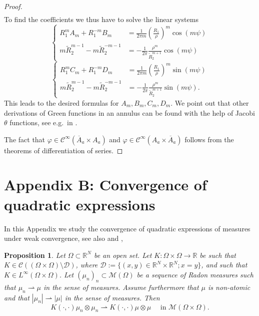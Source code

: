 \documentclass[12pt,reqno]{amsart}
\newtheorem{proposition}[theorem]{Proposition}
\def\C{{\mathcal C}}
\def\D{{\mathcal D}}
\def\M{{\mathcal M}}
\newcommand{\R}{\mathbb{R}}
\numberwithin{equation}{section}
\begin{document}
\begin{proof}
\begin{align*}
\end{align*}
To find the coefficients we thus have to solve the linear systems
\begin{equation*}
\left\{
\begin{array}{rcll}
R_1^mA_m+R_1^{-m}B_m &=\frac{1}{2\pi m} \left(\frac{R_1}{\rho} \right)^m \cos (m\psi) \\
m\tilde{R}_2^{m-1}-m\tilde{R}_2^{-m-1} &= -\frac{1}{2\pi} \frac{\rho^m}{\tilde{R}_2^{m+1}}\cos (m\psi) 
\end{array}
\right.
\end{equation*}
\begin{equation*}
\left\{
\begin{array}{rcll}
R_1^mC_m+R_1^{-m}D_m &=\frac{1}{2\pi m} \left(\frac{R_1}{\rho} \right)^m \sin(m\psi) \\
m\tilde{R}_2^{m-1}-m\tilde{R}_2^{-m-1} &= -\frac{1}{2\pi} \frac{\rho^m}{\tilde{R}_2^{m+1}}\sin (m\psi).
\end{array}
\right.
\end{equation*}
This leads to the desired formulas for \(A_m,B_m,C_m,D_m\). We point out that other derivations of Green functions in an annulus can be found with the help of Jacobi \(\theta\) functions, see e.g.\ in \cite{fetter67,Guenther_Massignan_Fetter_2017}.

The fact that \(\varphi \in \C^\infty(\overline{A}_a\times A_a)\) and \(\varphi \in \C^\infty( A_a\times \overline{A}_a)\) follows from the theorems of differentiation of series.
\end{proof}
\section*{Appendix B: Convergence of quadratic expressions}

In this Appendix we study the convergence of quadratic expressions of measures under weak convergence, see also \cite[Lemma 5.3]{Schochet_1995} and \cite[Lemma 6.3]{Peszek_Rodiac_2025},
\begin{proposition}\label{prop:Appendixb}
Let \(\Omega \subset \R^N\) be an open set. Let \(K:\Omega \times \Omega \rightarrow \R\) be such that \(K\in \C((\Omega \times \Omega) \setminus \D)\), where \(\D:=\{(x,y)\in \R^N\times \R^N; x=y\}\), and such that \(K\in L^\infty (\Omega \times \Omega)\). Let \( (\mu_n)_n\subset \mathcal{M}(\Omega)\) be a sequence of Radon measures such that \(\mu_n \rightharpoonup \mu\) in the sense of measures. Assume furthermore that \(\mu\) is non-atomic and that \(|\mu_n|\rightharpoonup |\mu|\) in the sense of measures. Then
\begin{equation}\label{eq:conv_quadratic}
K(\cdot,\cdot)\mu_n \otimes \mu_n \rightharpoonup K(\cdot,\cdot)\mu \otimes \mu \quad \text{ in }  \M(\Omega \times \Omega).
\end{equation}
\end{proposition}
\end{document}
